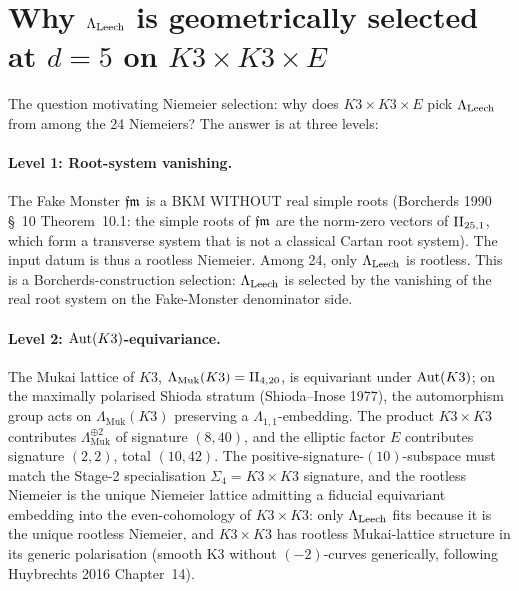 \section*{Why $\Lambda_{\mathrm{Leech}}$ is geometrically selected at $d = 5$ on
$K3 \times K3 \times E$}

The question motivating Niemeier selection: why does
$K3 \times K3 \times E$ pick $\Lambda_{\mathrm{Leech}}$ from among the 24 Niemeiers?
The answer is at three levels:

\paragraph{Level 1: Root-system vanishing.}
The Fake Monster $\mathfrak{fm}$ is a BKM WITHOUT real simple roots
(Borcherds 1990 \S~10 Theorem~10.1: the simple roots of $\mathfrak{fm}$ are
the norm-zero vectors of $\mathrm{II}_{25,1}$, which form a transverse
system that is not a classical Cartan root system). The input
datum is thus a rootless Niemeier. Among 24, only $\Lambda_{\mathrm{Leech}}$ is
rootless. This is a Borcherds-construction selection: $\Lambda_{\mathrm{Leech}}$ is
selected by the vanishing of the real root system on the
Fake-Monster denominator side.

\paragraph{Level 2: $\mathrm{Aut}(K3)$-equivariance.}
The Mukai lattice of $K3$, $\Lambda_{\mathrm{Muk}}(K3) =
\mathrm{II}_{4, 20}$, is equivariant under $\mathrm{Aut}(K3)$; on the maximally
polarised Shioda stratum (Shioda--Inose 1977), the automorphism
group acts on $\Lambda_{\mathrm{Muk}}(K3)$ preserving a
$\Lambda_{1, 1}$-embedding. The product $K3 \times K3$ contributes
$\Lambda_{\mathrm{Muk}}^{\oplus 2}$ of signature $(8, 40)$, and
the elliptic factor $E$ contributes signature $(2, 2)$, total
$(10, 42)$. The positive-signature-$(10)$-subspace must match the
Stage-2 specialisation $\Sigma_4 = K3 \times K3$ signature, and
the rootless Niemeier is the unique Niemeier lattice admitting a
fiducial equivariant embedding into the even-cohomology of
$K3 \times K3$: only $\Lambda_{\mathrm{Leech}}$ fits because it is the unique
rootless Niemeier, and $K3 \times K3$ has rootless Mukai-lattice
structure in its generic polarisation (smooth K3 without $(-2)$-curves
generically, following Huybrechts 2016 Chapter~14).

